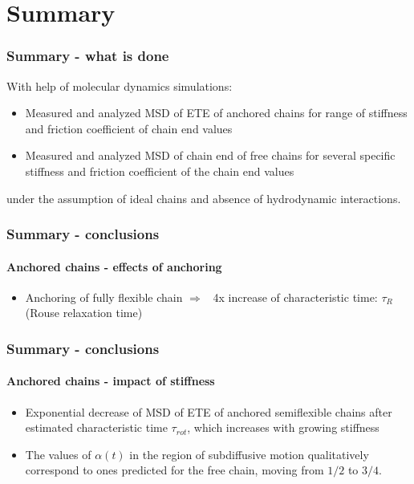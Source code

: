 \documentclass[handout]{beamer}
\begin{document}
\section{Summary}



\begin{frame}
    \frametitle{Summary - what is done}
    With help of molecular dynamics simulations:
    \begin{itemize}
        \item Measured and analyzed MSD of ETE of anchored chains for range of
        stiffness and friction coefficient of chain end values
        \item{Measured and analyzed MSD of chain end of free chains for several specific
        stiffness and friction coefficient of the chain end values}
    \end{itemize}
    under the assumption of ideal chains and absence of hydrodynamic interactions.
\end{frame}


\begin{frame}
    \frametitle{Summary - conclusions}
    \framesubtitle{Anchored chains - effects of anchoring}
    \begin{itemize}
        \item Anchoring of fully flexible chain $\Rightarrow$ ~4x increase of characteristic
        time: $\tau_R$ (Rouse relaxation time)
    \end{itemize}
\end{frame}

\begin{frame}
    \frametitle{Summary - conclusions}
    \framesubtitle{Anchored chains - impact of stiffness}
    \begin{itemize}
        \item Exponential decrease of MSD of ETE of anchored semiflexible chains
        after estimated characteristic time $\tau_{rot}$, which increases
        with growing stiffness
        \item The values of $\alpha(t)$ in the region of subdiffusive motion
        qualitatively correspond to ones predicted for the free chain,
        moving from $1/2$ to $3/4$.
    \end{itemize}
\end{frame}
\end{document}
